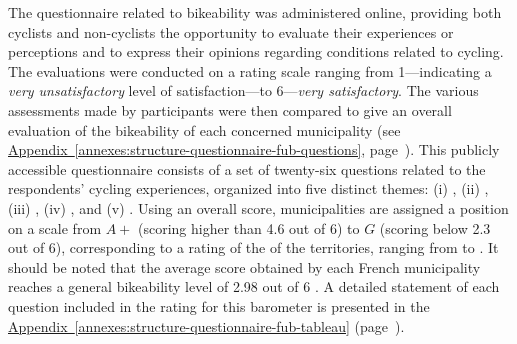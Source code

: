 \begin{refsegment}
The questionnaire related to bikeability was administered online, providing both cyclists and non-cyclists the opportunity to evaluate their experiences or perceptions and to express their opinions regarding conditions related to cycling. The evaluations were conducted on a rating scale ranging from 1—indicating a \textsl{very unsatisfactory} level of satisfaction—to 6—\textsl{very satisfactory}. The various assessments made by participants were then compared to give an overall evaluation of the bikeability of each concerned municipality (see \hyperref[annexes:structure-questionnaire-fub-questions]{Appendix~\ref{annexes:structure-questionnaire-fub-questions}}, page~\pageref{annexes:structure-questionnaire-fub-questions}). This publicly accessible questionnaire consists of a set of twenty-six questions related to the respondents' cycling experiences, organized into five distinct themes: (i) , (ii) , (iii) , (iv) , and (v) . Using an overall score, municipalities are assigned a position on a scale from \(A+\) (scoring higher than 4.6 out of 6) to \(G\) (scoring below 2.3 out of 6), corresponding to a rating of the  of the territories, ranging from  to  \textcolor{blue}{\autocite{fub_barometre_2021}}. It should be noted that the average score obtained by each French municipality reaches a general bikeability level of 2.98 out of 6 \textcolor{blue}{\autocite[17]{vermeulen_barometre_2022}}. A detailed statement of each question included in the rating for this barometer is presented in the \hyperref[annexes:structure-questionnaire-fub-tableau]{Appendix~\ref{annexes:structure-questionnaire-fub-tableau}} (page~\pageref{annexes:structure-questionnaire-fub-tableau}). %



\end{refsegment}
